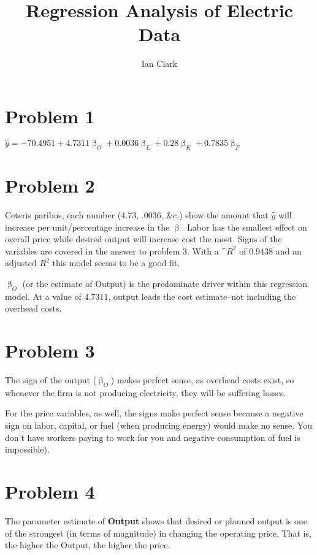 \documentclass[11pt,letterpaper,english]{article}
\title{Regression Analysis of Electric Data}
\author{Ian Clark}
\date{}
\begin{document}
\maketitle

\section*{Problem 1}
\begin{center}
$\hat{y} = -70.4951 + 4.7311\upbeta_O + 0.0036\upbeta_L + 0.28\upbeta_K + 0.7835\upbeta_F$
\end{center}

\section*{Problem 2}
Ceteris paribus, each number ($4.73$, $.0036$, \&c.) show the amount that $\hat{y}$ will increase per unit/percentage increase in the $\upbeta$. Labor has the smallest effect on overall price while desired output will increase cost the most. Signs of the variables are covered in the answer to problem 3. With a ^$R^2$ of $0.9438$ and an adjusted $R^2$ this model seems to be a good fit.

\vspace{5mm}
\noindent
$\upbeta_O$ (or the estimate of Output) is the predominate driver within this regression model. At a value of $4.7311$, output leads the cost estimate--not including the overhead costs.

\section*{Problem 3}
The sign of the output ($\upbeta_O$) makes perfect sense, as overhead costs exist, so whenever the firm is not producing electricity, they will be suffering losses.

\vspace{5mm}
\noindent
For the price variables, as well, the signs make perfect sense because a negative sign on labor, capital, or fuel (when producing energy) would make no sense. You don't have workers paying to work for you and negative consumption of fuel is impossible).

\section*{Problem 4}
The parameter estimate of \textbf{Output} shows that desired or planned output is one of the strongest (in terms of magnitude) in changing the operating price. That is, the higher the Output, the higher the price.
\end{document}
